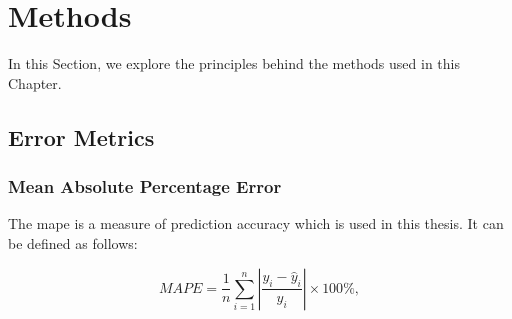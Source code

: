 \section{Methods}
\label{forecast:sec:methods}

In this Section, we explore the principles behind the methods used in this Chapter. 




%
%
%
%

\subsection{Error Metrics}

\subsubsection{Mean Absolute Percentage Error}

The \acrfull{mape} is a measure of prediction accuracy which is used in this thesis. It can be defined as follows:

\begin{equation}
MAPE=\frac{1}{n}\sum_{i=1}^n\left|\frac{y_i-\hat{y}_i}{y_i}\right|\times 100\%,
\end{equation}

